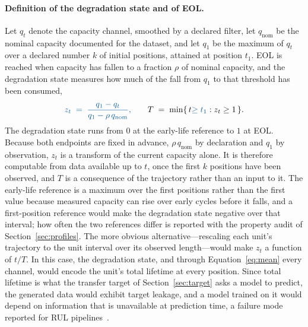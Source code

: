 \documentclass{article}
\newif\ifreview \reviewtrue        %
\newcommand{\rev}[1]{\ifreview\textcolor[HTML]{0B5FA5}{#1}\else#1\fi}
\newcommand{\revwhy}[1]{\ifreview\marginpar{\footnotesize\raggedright\textcolor[HTML]{0B5FA5}{#1}}\fi}
\begin{document}
\paragraph{Definition of the degradation state and of EOL.}
Let $q_t$ denote the capacity channel, smoothed by a declared filter, \rev{let $q_{\mathrm{nom}}$ be the nominal capacity documented for the dataset, and let $q_1$ be the maximum of $q_t$ over a declared number $k$ of initial positions, attained at position $t_1$. EOL is reached when capacity has fallen to a fraction $\rho$ of nominal capacity, and the degradation state measures how much of the fall from $q_1$ to that threshold has been consumed,}
\begin{equation}
  \rev{z_t \;=\; \frac{q_1 - q_t}{q_1 - \rho\, q_{\mathrm{nom}}},}
  \qquad
  T \;=\; \min\{\, t \rev{\ge t_1} : z_t \ge 1 \,\}.
  \label{eq:state}
\end{equation}
The degradation state runs from $0$ at \rev{the early-life reference} to $1$ at EOL. Because both endpoints are fixed in advance, \rev{$\rho\, q_{\mathrm{nom}}$} by declaration and $q_1$ by observation, $z_t$ is a transform of the current capacity alone. It is therefore computable from data available up to $t$\rev{, once the first $k$ positions have been observed,} and $T$ is a consequence of the trajectory rather than an input to it. \rev{The early-life reference is a maximum over the first positions rather than the first value because measured capacity can rise over early cycles before it falls, and a first-position reference would make the degradation state negative over that interval; how often the two references differ is reported with the property audit of Section~\ref{sec:profiles}.}\revwhy{C3: EOL against nominal capacity; robust $q_1$}
The more obvious alternative—rescaling each unit's trajectory to the unit interval over its observed length—would make $z_t$ a function of $t/T$. In this case, the degradation state, and through Equation~\ref{eq:mean} every channel, would encode the unit's total lifetime at every position. Since total lifetime is what the transfer target of Section~\ref{sec:target} asks a model to predict,  the generated data would exhibit target leakage, and a model trained on it would depend on information that is unavailable at prediction time, a failure mode reported for RUL pipelines~\cite{mishchukaciids2026}.
 
\end{document}
